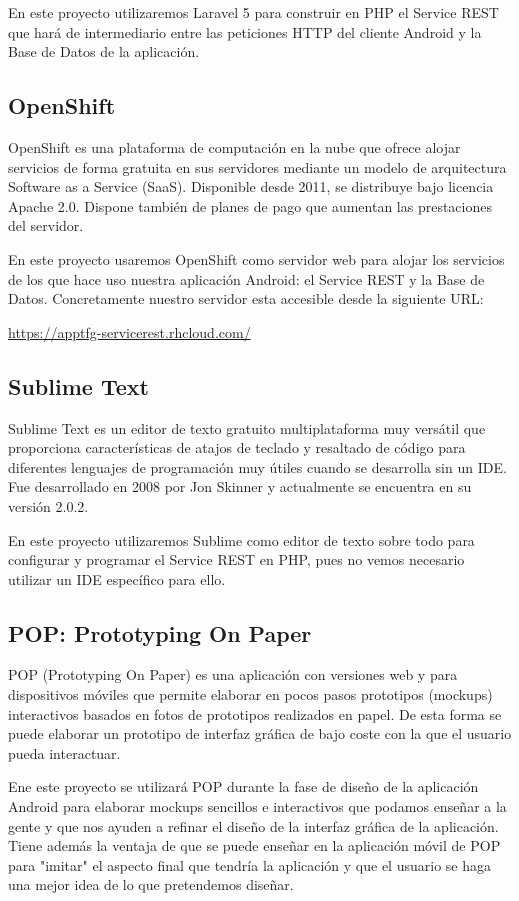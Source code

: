 	En este proyecto utilizaremos Laravel 5 para construir en PHP el Service REST que hará de intermediario entre las peticiones HTTP del cliente Android y la Base de Datos de la aplicación.
    
    \subsection{OpenShift}\label{ssec:openshift}
    
	OpenShift \cite{ref:OpenShift} es una plataforma de computación en la nube que ofrece alojar servicios de forma gratuita en sus servidores mediante un modelo de arquitectura Software as a Service (SaaS). Disponible desde 2011, se distribuye bajo licencia Apache 2.0. Dispone también de planes de pago que aumentan las prestaciones del servidor.
	
	En este proyecto usaremos OpenShift como servidor web para alojar los servicios de los que hace uso nuestra aplicación Android: el Service REST y la Base de Datos. Concretamente nuestro servidor esta accesible desde la siguiente URL:
	
	\url{https://apptfg-servicerest.rhcloud.com/}    
    
    \subsection{Sublime Text}\label{ssec:sublime}
    
    Sublime Text \cite{ref:sublime} es un editor de texto gratuito multiplataforma muy versátil que proporciona características de atajos de teclado y resaltado de código para diferentes lenguajes de programación muy útiles cuando se desarrolla sin un IDE. Fue desarrollado en 2008 por Jon Skinner y actualmente se encuentra en su versión 2.0.2.
    
    En este proyecto utilizaremos Sublime como editor de texto sobre todo para configurar y programar el Service REST en PHP, pues no vemos necesario utilizar un IDE específico para ello.
    
    \subsection{POP: Prototyping On Paper}\label{ssec:pop}
    
    POP \cite{ref:pop} (Prototyping On Paper) es una aplicación con versiones web y para dispositivos móviles que permite elaborar en pocos pasos prototipos (mockups) interactivos basados en fotos de prototipos realizados en papel. De esta forma se puede elaborar un prototipo de interfaz gráfica de bajo coste con la que el usuario pueda interactuar.
    
    Ene este proyecto se utilizará POP durante la fase de diseño de la aplicación Android para elaborar mockups sencillos e interactivos que podamos enseñar a la gente y que nos ayuden a refinar el diseño de la interfaz gráfica de la aplicación. Tiene además la ventaja de que se puede enseñar en la aplicación móvil de POP para "imitar" el aspecto final que tendría la aplicación y que el usuario se haga una mejor idea de lo que pretendemos diseñar.
    